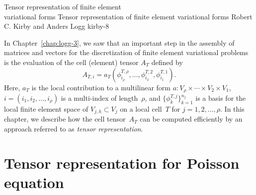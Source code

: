               {Tensor representation of finite element \\ variational forms}
              {Tensor representation of finite element variational forms}
              {Robert C. Kirby and Anders Logg}
              {kirby-8}

In Chapter~\ref{chap:logg-3}, we saw that an important step in the
assembly of matrices and vectors for the discretization of finite
element variational problems is the evaluation of the cell (element)
tensor $A_T$ defined by
\begin{equation}
  A_{T,i}
  = a_T(\phi^{T,\rho}_{i_{\rho}}, \ldots, \phi^{T,2}_{i_2}, \phi^{T,1}_{i_1}).
\end{equation}
Here, $a_T$ is the local contribution to a multilinear form $a:
V_{\rho} \times \cdots \times V_2 \times V_1$,
$i=(i_1,i_2,\dots,i_\rho)$ is a multi-index of length~$\rho$, and
$\{\phi^{T,j}_k\}_{k=1}^{n_j}$ is a basis for the local finite element
space of $V_{j,h} \subset V_j$ on a local cell~$T$ for $j =
1,2,\ldots,\rho$. In this chapter, we describe how the cell
tensor~$A_T$ can be computed efficiently by an approach referred to as
\emph{tensor representation}.

\section{Tensor representation for Poisson equation}

